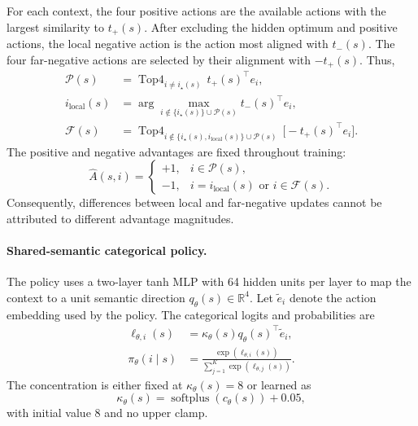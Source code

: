 \documentclass{article}
\theoremstyle{plain}
\theoremstyle{definition}
\theoremstyle{remark}
\begin{document}
For each context, the four positive actions are the available actions
with the largest similarity to $t_+(s)$. After excluding the hidden
optimum and positive actions, the local negative action is the action
most aligned with $t_-(s)$. The four far-negative actions are selected
by their alignment with $-t_+(s)$. Thus,
\begin{equation}
\begin{aligned}
    \mathcal P(s)
    &=
    \operatorname{Top4}_{i\neq i_\star(s)}
    \,
    t_+(s)^\top e_i, \\
    i_{\mathrm{local}}(s)
    &=
    \arg\max_{i\notin
        \{i_\star(s)\}\cup\mathcal P(s)}
    t_-(s)^\top e_i, \\
    \mathcal F(s)
    &=
    \operatorname{Top4}_{i\notin
        \{i_\star(s),i_{\mathrm{local}}(s)\}
        \cup\mathcal P(s)}
    \,
    \bigl[-t_+(s)^\top e_i\bigr].
\end{aligned}
\label{eq:du1_action_roles}
\end{equation}
The positive and negative advantages are fixed throughout training:
\begin{equation}
    \widehat A(s,i)
    =
    \begin{cases}
        +1,
        & i\in\mathcal P(s),\\
        -1,
        & i=i_{\mathrm{local}}(s)
          \text{ or }i\in\mathcal F(s).
    \end{cases}
    \label{eq:du1_fixed_advantages}
\end{equation}
Consequently, differences between local and far-negative updates cannot
be attributed to different advantage magnitudes.

\paragraph{Shared-semantic categorical policy.}
The policy uses a two-layer tanh MLP with 64 hidden units per layer to
map the context to a unit semantic direction
$q_\theta(s)\in\mathbb R^4$.
Let $\widetilde e_i$ denote the action embedding used by the policy. The
categorical logits and probabilities are
\begin{equation}
\begin{aligned}
    \ell_{\theta,i}(s)
    &=
    \kappa_\theta(s)
    q_\theta(s)^\top
    \widetilde e_i, \\
    \pi_\theta(i\mid s)
    &=
    \frac{
        \exp\!\left(\ell_{\theta,i}(s)\right)
    }{
        \sum_{j=1}^{K}
        \exp\!\left(\ell_{\theta,j}(s)\right)
    }.
\end{aligned}
\label{eq:du1_policy}
\end{equation}
The concentration is either fixed at
$\kappa_\theta(s)=8$
or learned as
\begin{equation}
    \kappa_\theta(s)
    =
    \operatorname{softplus}
    \!\left(
        c_\theta(s)
    \right)
    +
    0.05,
    \label{eq:du1_concentration}
\end{equation}
with initial value 8 and no upper clamp.
\end{document}
